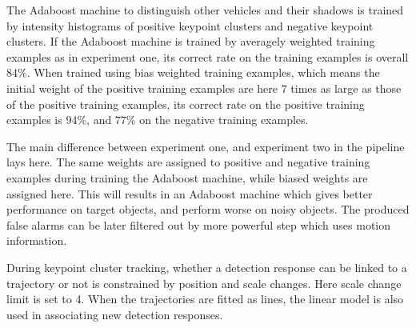 The Adaboost machine to distinguish other vehicles and their shadows is trained by intensity histograms of positive keypoint clusters and negative keypoint clusters.  If the Adaboost machine is trained by averagely weighted training examples as in experiment one, its correct rate on the training examples is overall 84\%. When trained using bias weighted training examples, which means the initial weight of the positive training examples are here $7$ times as large as those of the positive training examples, its correct rate on the positive training examples is 94\%, and 77\% on the negative training examples.

The main difference between experiment one, and experiment two in the pipeline lays here. The same weights are assigned to positive and negative training examples during training the Adaboost machine, while biased weights are assigned here. This will results in an Adaboost machine which gives better performance on target objects, and perform worse on noisy objects. The produced false alarms can be later filtered out by more powerful step which uses motion information.

During keypoint cluster tracking, whether a detection response can be linked to a trajectory or not is constrained by position and scale changes. Here scale change limit is set to 4. When the trajectories are fitted as lines, the linear model is also used in associating new detection responses.



